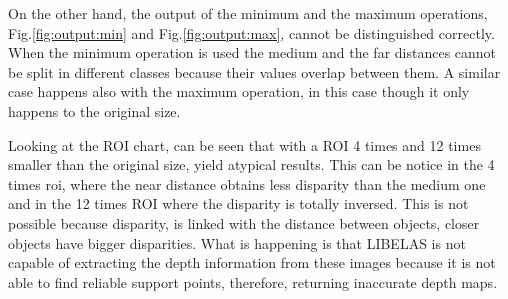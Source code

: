 \documentclass[10pt,a4paper,twocolumn,twoside]{article}
\begin{document}
	On the other hand, the output of the minimum and the maximum operations, Fig.\ref{fig:output:min} and Fig.\ref{fig:output:max}, cannot be distinguished correctly. When the minimum operation is used the medium and the far distances cannot be split in different classes because their values overlap between them. A similar case happens also with the maximum operation, in this case though it only happens to the original size. %
	
	Looking at the ROI chart, can be seen that with a ROI 4 times and 12 times smaller than the original size, yield atypical results. This can be notice in the 4 times roi, where the near distance obtains less disparity than the medium one and in the 12 times ROI where the disparity is totally inversed. This is not possible because disparity, is linked with the distance between objects, closer objects have bigger disparities. What is happening is that LIBELAS is not capable of extracting the depth information from these images because it is not able to find reliable support points, therefore, returning inaccurate depth maps. 
\end{document}
